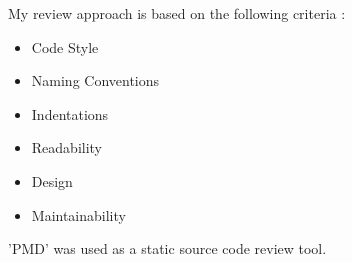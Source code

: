 My review approach is based on the following criteria :

\begin{itemize}
    \item Code Style
    \item Naming Conventions 
    \item Indentations
    \item Readability
    \item Design
    \item Maintainability 
\end{itemize}
'PMD' was used as a static source code review tool. 
